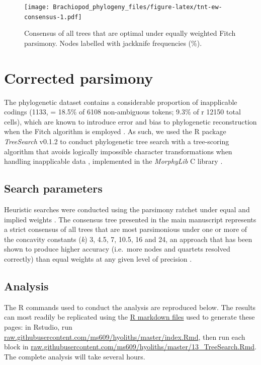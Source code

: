 \documentclass[openany]{book}
\begin{document}
\newpage




\begin{figure}
\centering
\texttt{[image: Brachiopod\_phylogeny\_files/figure-latex/tnt-ew-consensus-1.pdf]}
\caption{\label{fig:tnt-ew-consensus}Consensus of all trees that are optimal under equally
weighted Fitch parsimony. Nodes labelled with jackknife frequencies (\%).}
\end{figure}

\hypertarget{treesearch}{\chapter{Corrected
parsimony}\label{treesearch}}

The phylogenetic dataset contains a considerable proportion of
inapplicable codings (1133, = 18.5\% of 6108 non-ambiguous tokens; 9.3\%
of r 12150 total cells), which are known to introduce error and bias to
phylogenetic reconstruction when the Fitch algorithm is employed
\citep{Maddison1993, Brazeau2018}. As such, we used the R package
\emph{TreeSearch} v0.1.2 \citep{Smith2018TreeSearch} to conduct
phylogenetic tree search with a tree-scoring algorithm that avoids
logically impossible character transformations when handling
inapplicable data \citep{Brazeau2018}, implemented in the
\emph{MorphyLib} C library \citep{Brazeau2017Morphylib}.

\section{Search parameters}\label{search-parameters}

Heuristic searches were conducted using the parsimony ratchet
\citep{Nixon1999} under equal and implied weights \citep{Goloboff1997}.
The consensus tree presented in the main manuscript represents a strict
consensus of all trees that are most parsimonious under one or more of
the concavity constants (\emph{k}) 3, 4.5, 7, 10.5, 16 and 24, an
approach that has been shown to produce higher accuracy (i.e.~more nodes
and quartets resolved correctly) than equal weights at any given level
of precision \citep{Smith2017}.

\section{Analysis}\label{analysis}

The R commands used to conduct the analysis are reproduced below. The
results can most readily be replicated using the
\href{https://github.com/ms609/hyoliths/}{R markdown files} used to
generate these pages: in Rstudio, run
\href{https://raw.githubusercontent.com/ms609/hyoliths/master/index.Rmd}{raw.githubusercontent.com/ms609/hyoliths/master/index.Rmd},
then run each block in
\href{https://raw.githubusercontent.com/ms609/hyoliths/master/13_TreeSearch.Rmd}{raw.githubusercontent.com/ms609/hyoliths/master/13\_TreeSearch.Rmd}.
The complete analysis will take several hours.
\end{document}
